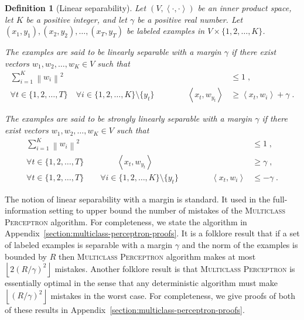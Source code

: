 \documentclass[12pt]{article}
\newtheorem{definition}{Definition}
\newcommand{\ip}[2]{\left\langle #1, #2 \right\rangle} %
\newcommand{\norm}[1]{\left\| #1 \right\|}  %
\begin{document}
\begin{definition}[Linear separability]
Let $(V,\ip{\cdot}{\cdot})$ be an inner product space, let $K$ be a positive
integer, and let $\gamma$ be a positive real number. Let $(x_1, y_1), (x_2,
y_2), \dots, (x_T, y_T)$ be labeled examples in $V \times \{1,2,\dots,K\}$.

The examples are said to be \emph{linearly separable with a
margin $\gamma$} if there exist vectors $w_1, w_2, \dots, w_K \in V$ such
that
\begin{align}
\label{equation:linear-separability-1}
\sum_{i=1}^K \norm{w_i}^2 & \le 1 \; , \\
\label{equation:linear-separability-2}
\forall t \in \{1,2,\dots,T\} \quad \forall i \in \{1,2,\dots, K\} \setminus \{y_t\} \qquad \qquad \ip{x_t}{w_{y_t}} & \ge \ip{x_t}{w_i} + \gamma \; .
\end{align}

The examples are said to be \emph{strongly linearly separable with a
margin $\gamma$} if there exist vectors $w_1, w_2, \dots, w_K \in V$ such
that
\begin{align}
\label{equation:strong-linear-separability-1}
\sum_{i=1}^K \norm{w_i}^2 & \le 1 \; , \\
\label{equation:strong-linear-separability-2}
\forall t \in \{1,2,\dots,T\} \qquad \qquad \ip{x_t}{w_{y_t}} &\ge \gamma \; , \\
\label{equation:strong-linear-separability-3}
\forall t \in \{1,2,\dots,T\} \qquad \forall i \in \{1,2,\dots, K\} \setminus \{y_t\} \qquad \qquad \ip{x_t}{w_i} & \le - \gamma \; .
\end{align}
\end{definition}

The notion of linear separability with a margin is standard. It used in the
full-information setting to upper bound the number of mistakes of the
\textsc{Multiclass Perceptron} algorithm. For completeness, we state the
algorithm in Appendix~\ref{section:multiclass-perceptron-proofs}. It is a
folklore result that if a set of labeled examples is separable with a margin
$\gamma$ and the norm of the examples is bounded by $R$ then \textsc{Multiclass
Perceptron} algorithm makes at most $\left\lfloor 2(R/\gamma)^2 \right \rfloor$
mistakes. Another folklore result is that \textsc{Multiclass Perceptron} is
essentially optimal in the sense that any deterministic algorithm must make
$\left\lfloor (R/\gamma)^2 \right \rfloor$ mistakes in the worst case. For
completeness, we give proofs of both of these results in
Appendix~\ref{section:multiclass-perceptron-proofs}.
\end{document}
